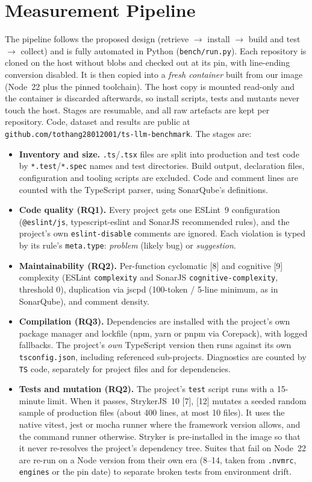 \documentclass[10pt,conference]{IEEEtran}
\begin{document}
\section{Measurement Pipeline}
The pipeline follows the proposed design (retrieve $\rightarrow$ install $\rightarrow$ build and test $\rightarrow$ collect) and is fully automated in Python (\texttt{bench/run.py}). Each repository is cloned on the host without blobs and checked out at its pin, with line-ending conversion disabled. It is then copied into a \emph{fresh container} built from our image (Node~22 plus the pinned toolchain). The host copy is mounted read-only and the container is discarded afterwards, so install scripts, tests and mutants never touch the host. Stages are resumable, and all raw artefacts are kept per repository. Code, dataset and results are public at \texttt{github.com/tothang28012001/ts-llm-benchmark}. The stages are:

\begin{itemize}
\item \textbf{Inventory and size.} \texttt{.ts}/\texttt{.tsx} files are split into production and test code by \texttt{*.test}/\texttt{*.spec} names and test directories. Build output, declaration files, configuration and tooling scripts are excluded. Code and comment lines are counted with the TypeScript parser, using SonarQube's definitions.
\item \textbf{Code quality (RQ1).} Every project gets one ESLint~9 configuration (\texttt{@eslint/js}, typescript-eslint and SonarJS recommended rules), and the project's own \texttt{eslint-disable} comments are ignored. Each violation is typed by its rule's \texttt{meta.type}: \emph{problem} (likely bug) or \emph{suggestion}.
\item \textbf{Maintainability (RQ2).} Per-function cyclomatic [8] and cognitive [9] complexity (ESLint \texttt{complexity} and SonarJS \texttt{cognitive-complexity}, threshold 0), duplication via jscpd (100-token / 5-line minimum, as in SonarQube), and comment density.
\item \textbf{Compilation (RQ3).} Dependencies are installed with the project's own package manager and lockfile (npm, yarn or pnpm via Corepack), with logged fallbacks. The project's \emph{own} TypeScript version then runs against its own \texttt{tsconfig.json}, including referenced sub-projects. Diagnostics are counted by \texttt{TS} code, separately for project files and for dependencies.
\item \textbf{Tests and mutation (RQ2).} The project's \texttt{test} script runs with a 15-minute limit. When it passes, StrykerJS~10 [7], [12] mutates a seeded random sample of production files (about 400 lines, at most 10 files). It uses the native vitest, jest or mocha runner where the framework version allows, and the command runner otherwise. Stryker is pre-installed in the image so that it never re-resolves the project's dependency tree. Suites that fail on Node~22 are re-run on a Node version from their own era (8--14, taken from \texttt{.nvmrc}, \texttt{engines} or the pin date) to separate broken tests from environment drift.
\end{itemize}
\end{document}
